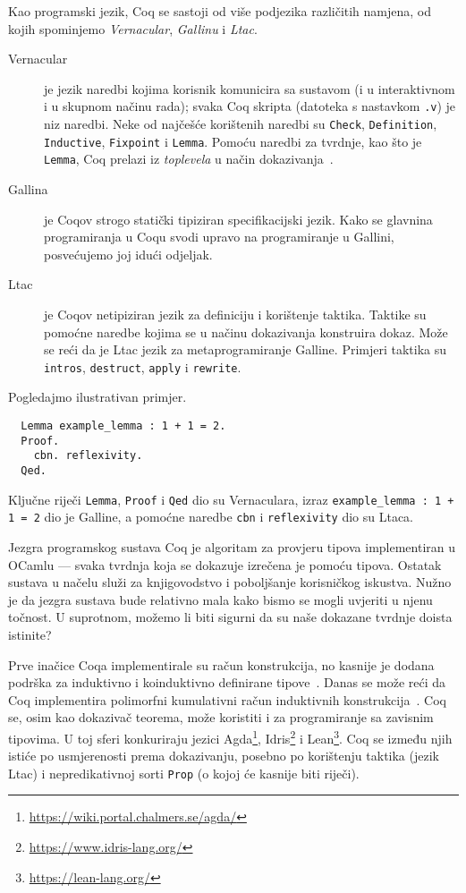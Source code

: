 Kao programski jezik, Coq se sastoji od više podjezika različitih namjena, od kojih spominjemo \textit{Vernacular}, \textit{Gallinu} i \textit{Ltac}.
\begin{description}
\item[Vernacular]  je jezik naredbi kojima korisnik komunicira sa sustavom (i u interaktivnom i u skupnom načinu rada);
  svaka Coq skripta (datoteka s nastavkom \texttt{.v}) je niz naredbi.
  Neke od najčešće korištenih naredbi su \texttt{Check}, \texttt{Definition}, \texttt{Inductive}, \texttt{Fixpoint} i \texttt{Lemma}.
  Pomoću naredbi za tvrdnje, kao što je \texttt{Lemma}, Coq prelazi iz \textit{toplevela} u način dokazivanja~.
\item[Gallina] je Coqov strogo statički tipiziran specifikacijski jezik.
  Kako se glavnina programiranja u Coqu svodi upravo na programiranje u Gallini, posvećujemo joj idući odjeljak.
\item[Ltac] je Coqov netipiziran jezik za definiciju i korištenje taktika.
  Taktike su pomoćne naredbe kojima se u načinu dokazivanja konstruira dokaz.
  Može se reći da je Ltac jezik za metaprogramiranje Galline.
  Primjeri taktika su \texttt{intros}, \texttt{destruct}, \texttt{apply} i \texttt{rewrite}.
\end{description}
\noindent Pogledajmo ilustrativan primjer.
\begin{verbatim}
  Lemma example_lemma : 1 + 1 = 2.
  Proof.
    cbn. reflexivity.
  Qed.
\end{verbatim}
\noindent Ključne riječi \texttt{Lemma}, \texttt{Proof} i \texttt{Qed} dio su Vernaculara,
izraz \texttt{example\_lemma : 1 + 1 = 2} dio je Galline,
a pomoćne naredbe \texttt{cbn} i \texttt{reflexivity} dio su Ltaca.

Jezgra programskog sustava Coq je algoritam za provjeru tipova  implementiran u OCamlu ---
svaka tvrdnja koja se dokazuje izrečena je pomoću tipova.
Ostatak sustava u načelu služi za knjigovodstvo i poboljšanje korisničkog iskustva.
Nužno je da jezgra sustava bude relativno mala kako bismo se mogli uvjeriti u njenu točnost.
U suprotnom, možemo li biti sigurni da su naše dokazane tvrdnje doista istinite?

Prve inačice Coqa implementirale su račun konstrukcija, no kasnije je dodana podrška za induktivno i koinduktivno definirane tipove~\cite{cic, coinductive}.
Danas se može reći da Coq implementira polimorfni kumulativni račun induktivnih konstrukcija~\cite{coqcoqcorrect}.
Coq se, osim kao dokazivač teorema, može koristiti i za programiranje sa zavisnim tipovima.
U toj sferi konkuriraju jezici Agda\footnote{\url{https://wiki.portal.chalmers.se/agda/}}, Idris\footnote{\url{https://www.idris-lang.org/}} i Lean\footnote{\url{https://lean-lang.org/}}. Coq se između njih istiće po usmjerenosti prema dokazivanju, posebno po korištenju taktika (jezik Ltac) i nepredikativnoj sorti \texttt{Prop} (o kojoj će kasnije biti riječi).

